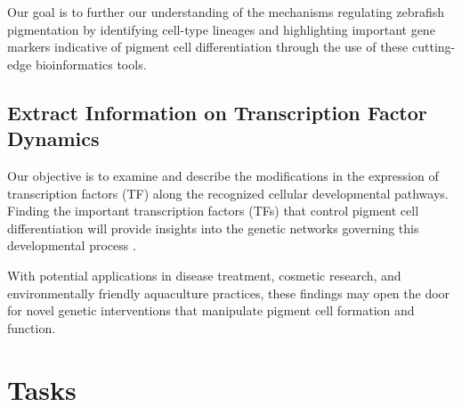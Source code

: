 \documentclass[runningheads]{llncs}
\begin{document}
Our goal is to further our understanding of the mechanisms regulating zebrafish pigmentation by identifying cell-type lineages and highlighting important gene markers indicative of pigment cell differentiation through the use of these cutting-edge bioinformatics tools.

\subsection{Extract Information on Transcription Factor Dynamics}
Our objective is to examine and describe the modifications in the expression of transcription factors (TF) along the recognized cellular developmental pathways. Finding the important transcription factors (TFs) that control pigment cell differentiation will provide insights into the genetic networks governing this developmental process \cite{subkhankulova2023zebrafish,saunders2019thyroid,fabian2022lifelong}. 

With potential applications in disease treatment, cosmetic research, and environmentally friendly aquaculture practices, these findings may open the door for novel genetic interventions that manipulate pigment cell formation and function.

\section{Tasks}
\end{document}
